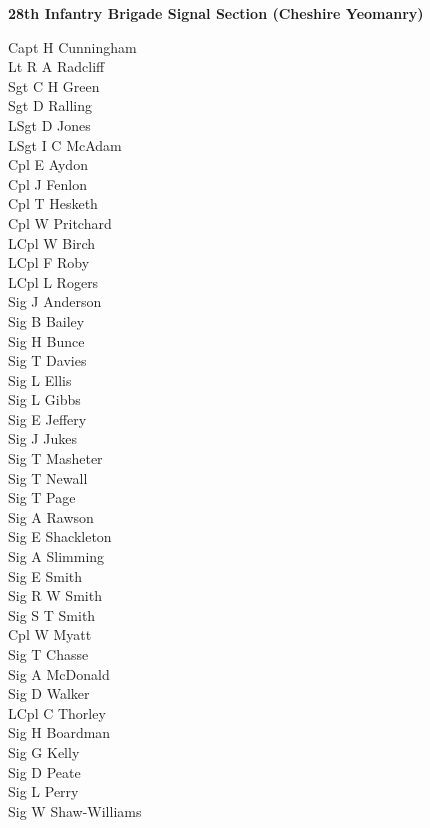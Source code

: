 \begin{center}
  \Large
  \textbf{28th Infantry Brigade Signal Section (Cheshire Yeomanry)}
\end{center}

\begin{multicols}{2}
  \noindent
  Capt H Cunningham \\
  Lt R A Radcliff \\
  Sgt C H Green \\
  Sgt D Ralling \\
  LSgt D Jones \\
  LSgt I C McAdam \\
  Cpl E Aydon \\
  Cpl J Fenlon \\
  Cpl T Hesketh \\
  Cpl W Pritchard \\
  LCpl W Birch \\
  LCpl F Roby \\
  LCpl L Rogers \\
  Sig J Anderson \\
  Sig B Bailey \\
  Sig H Bunce \\
  Sig T Davies \\
  Sig L Ellis \\
  Sig L Gibbs \\
  Sig E Jeffery \\
  Sig J Jukes \\
  Sig T Masheter \\
  Sig T Newall \\
  Sig T Page \\
  Sig A Rawson \\
  Sig E Shackleton \\
  Sig A Slimming \\
  Sig E Smith \\
  Sig R W Smith \\
  Sig S T Smith \\
  Cpl W Myatt \\
  Sig T Chasse \\
  Sig A McDonald \\
  Sig D Walker \\
  LCpl C Thorley \\
  Sig H Boardman \\
  Sig G Kelly \\
  Sig D Peate \\
  Sig L Perry \\
  Sig W Shaw-Williams \\

\end{multicols}
